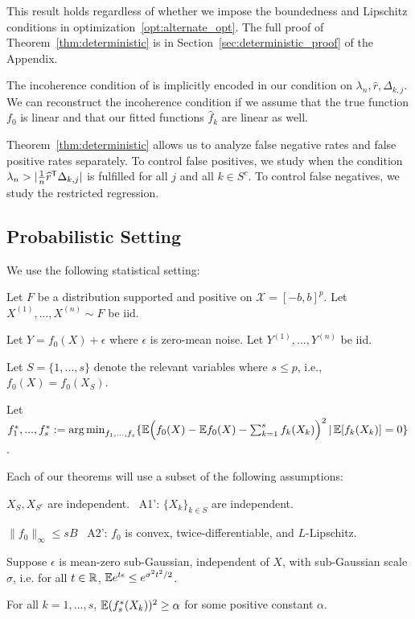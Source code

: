 This result holds regardless of whether we impose the boundedness and Lipschitz conditions in optimization~\ref{opt:alternate_opt}.
The full proof of Theorem~\ref{thm:deterministic} is in Section~\ref{sec:deterministic_proof} of the Appendix.

\begin{remark}
  The incoherence condition of \cite{Wain:09a} is implicitly encoded
  in our condition on $\lambda_n, \hat{r}, \Delta_{k,j}$. We can
  reconstruct the incoherence condition if we assume that the true
  function $f_0$ is linear and that our fitted functions $\hat{f}_k$
  are linear as well.
\end{remark}

Theorem~\ref{thm:deterministic} allows us to analyze false negative
rates and false positive rates separately. To control false positives,
we study when the condition $\lambda_n > | \frac{1}{n} \widehat{r}^{\mathsf{T}}
\Delta_{k,j}|$ is fulfilled for all $j$ and all $k \in S^c$. To
control false negatives, we study the restricted regression.

\subsection{Probabilistic Setting}

We use the following statistical setting:

\begin{packed_enum}
\item Let $F$ be a distribution supported and positive on $\mathcal{X}=[-b,b]^p$. Let $X^{(1)},..., X^{(n)} \sim F$ be iid.
\item Let $Y = f_0(X) + \epsilon$ where $\epsilon$ is zero-mean noise. Let $Y^{(1)},...,Y^{(n)}$ be iid.
\item Let $S = \{1,...,s\}$ denote the relevant variables where $s\leq p$, i.e.,
  $f_0(X) = f_0(X_S)$.
\item Let $f^*_1,...,f^*_s := \mathop{\text{\rm arg\,min}}_{f_1,...,f_s} \{ {\mathbb E}\Big(f_0(X) -{\mathbb E} f_0(X) - \sum_{k=1}^s f_k(X_k)\Big)^2 \,|\, {\mathbb E}[f_k(X_k)] = 0 \}$.
\end{packed_enum}

Each of our theorems will use a subset of the following assumptions:
\begin{packed_enum}
\item[A1:] $X_S, X_{S^c}$ are independent.  \ A1': $\{ X_k \}_{k \in S}$ are independent.
\item[A2:] $\|f_0\|_\infty \leq sB$ \  A2': $f_0$ is convex,
  twice-differentiable, and $L$-Lipschitz.
\item[A3:] Suppose $\epsilon$ is mean-zero sub-Gaussian, independent of $X$, with sub-Gaussian scale $\sigma$, i.e. for all $t \in {\mathbb R}$, ${\mathbb E} e^{t \epsilon} \leq e^{\sigma^2 t^2 / 2}$.
\item[A4:] For all $k=1,...,s$, ${\mathbb E}(f^*_s(X_k))^2 \geq \alpha$ for some positive constant $\alpha$.
\end{packed_enum}

